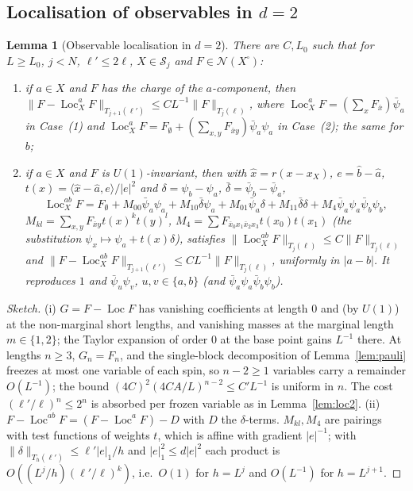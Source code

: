 \documentclass[11pt]{amsart}
\newtheorem{lemma}[theorem]{Lemma}
\theoremstyle{definition}
\theoremstyle{remark}
\numberwithin{equation}{section}
\newcommand{\cS}{\mathcal{S}}
\newcommand{\cN}{\mathcal{N}}
\newcommand{\Loc}{\operatorname{Loc}}
\begin{document}
\subsection{Localisation of observables in $d=2$}
\label{sec:loc-obs2}
\begin{lemma}[Observable localisation in $d=2$]\label{lem:loc-obs2}
There are $C,L_0$ such that for $L\ge L_0$, $j<N$, $\ell'\le2\ell$, $X\in\cS_j$ and $F\in\cN(X^\square)$:
\begin{enumerate}[label=(\roman*)]
\item if $a\in X$ and $F$ has the charge of the $a$-component, then
  $\|F-\Loc^a_XF\|_{T_{j+1}(\ell')}\le CL^{-1}\|F\|_{T_j(\ell)}$, where $\Loc^a_XF=(\sum_x F_{\bar x})\bar\psi_a$
  in Case~(1) and $\Loc^a_XF=F_\emptyset+(\sum_{x,y}F_{\bar xy})\bar\psi_a\psi_a$ in Case~(2); the same for $b$;
\item if $a\in X$ and $F$ is $U(1)$-invariant, then with $\hat x=r(x-x_X)$, $e=\hat b-\hat a$,
  $t(x)=\langle\hat x-\hat a,e\rangle/|e|^2$ and $\delta=\psi_b-\psi_a$, $\bar\delta=\bar\psi_b-\bar\psi_a$,
  \[\Loc^{ab}_XF=F_\emptyset+M_{00}\bar\psi_a\psi_a+M_{10}\bar\delta\psi_a+M_{01}\bar\psi_a\delta+M_{11}\bar\delta\delta
     +M_4\bar\psi_a\psi_a\bar\psi_b\psi_b,\]
  $M_{kl}=\sum_{x,y}F_{\bar xy}t(x)^kt(y)^l$, $M_4=\sum F_{\bar x_0x_1\bar x_2x_3}t(x_0)t(x_1)$
  (the substitution $\psi_x\mapsto\psi_a+t(x)\delta$), satisfies
  $\|\Loc^{ab}_XF\|_{T_j(\ell)}\le C\|F\|_{T_j(\ell)}$ and
  $\|F-\Loc^{ab}_XF\|_{T_{j+1}(\ell')}\le CL^{-1}\|F\|_{T_j(\ell)}$, uniformly in $|a-b|$.
  It reproduces $1$ and $\bar\psi_u\psi_v$, $u,v\in\{a,b\}$ (and $\bar\psi_a\psi_a\bar\psi_b\psi_b$).
\end{enumerate}
\end{lemma}
\begin{proof}[Sketch]
(i) $G=F-\Loc F$ has vanishing coefficients at length $0$ and (by $U(1)$) at the non-marginal short
lengths, and vanishing masses at the marginal length $m\in\{1,2\}$; the Taylor expansion of order $0$
at the base point gains $L^{-1}$ there. At lengths $n\ge3$, $G_n=F_n$, and the single-block
decomposition of Lemma~\ref{lem:pauli} freezes at most one variable of each spin, so $n-2\ge1$
variables carry a remainder $O(L^{-1})$; the bound $(4C)^2(4CA/L)^{n-2}\le C'L^{-1}$ is uniform in $n$.
The cost $(\ell'/\ell)^n\le2^n$ is absorbed per frozen variable as in Lemma~\ref{lem:loc2}.
(ii) $F-\Loc^{ab}F=(F-\Loc^aF)-D$ with $D$ the $\delta$-terms. $M_{kl},M_4$ are pairings with test
functions of weights $t$, which is affine with gradient $|e|^{-1}$; with
$\|\delta\|_{T_h(\ell')}\le\ell'|e|_1/h$ and $|e|_1^2\le d|e|^2$ each product is $O((L^j/h)(\ell'/\ell)^k)$,
i.e.\ $O(1)$ for $h=L^j$ and $O(L^{-1})$ for $h=L^{j+1}$.
\end{proof}
\end{document}
